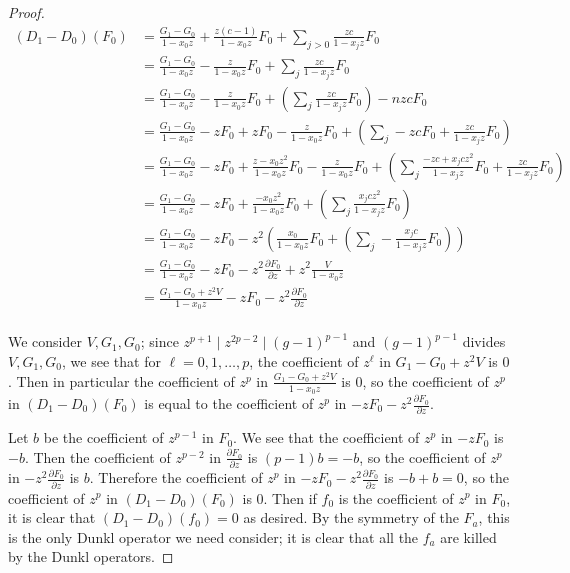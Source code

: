 \documentclass{article}
\numberwithin{equation}{section}
\begin{document}
\begin{proof}
\begin{align*}
(D_1-D_0)(F_0)&=\frac{G_1-G_0}{1-x_0z}+\frac{z(c-1)}{1-x_0z}F_0+\sum_{j>0} \frac{zc}{1-x_jz}F_0\\
&=\frac{G_1-G_0}{1-x_0z}-\frac{z}{1-x_0z}F_0+\sum_{j} \frac{zc}{1-x_jz}F_0\\
&=\frac{G_1-G_0}{1-x_0z}-\frac{z}{1-x_0z}F_0+\left(\sum_{j} \frac{zc}{1-x_jz}F_0\right)-nzcF_0\\
&=\frac{G_1-G_0}{1-x_0z}-zF_0+zF_0-\frac{z}{1-x_0z}F_0+\left(\sum_{j} -zcF_0+\frac{zc}{1-x_jz}F_0\right)\\
&=\frac{G_1-G_0}{1-x_0z}-zF_0+\frac{z-x_0z^2}{1-x_0z}F_0-\frac{z}{1-x_0z}F_0+\left(\sum_{j} \frac{-zc+x_jcz^2}{1-x_jz}F_0+\frac{zc}{1-x_jz}F_0\right)\\
&=\frac{G_1-G_0}{1-x_0z}-zF_0+\frac{-x_0z^2}{1-x_0z}F_0+\left(\sum_{j} \frac{x_jcz^2}{1-x_jz}F_0\right)\\
&=\frac{G_1-G_0}{1-x_0z}-zF_0-z^2\left(\frac{x_0}{1-x_0z}F_0+\left(\sum_{j}- \frac{x_jc}{1-x_jz}F_0\right)\right)\\
&=\frac{G_1-G_0}{1-x_0z}-zF_0-z^2\frac{\partial F_0}{\partial z}+z^2\frac{V}{1-x_0z}\\
&=\frac{G_1-G_0+z^2V}{1-x_0z}-zF_0-z^2\frac{\partial F_0}{\partial z}\\
\end{align*}

We consider $V,G_1,G_0$; since $z^{p+1} \mid z^{2p-2} \mid (g-1)^{p-1}$ and $(g-1)^{p-1}$ divides $V,G_1,G_0$, we see that for $\ell=0,1,\dots,p$, the coefficient of $z^\ell$ in $G_1-G_0+z^2V$ is $0$. Then in particular the coefficient of $z^p$ in $\frac{G_1-G_0+z^2V}{1-x_0z}$ is $0$, so the coefficient of $z^p$ in $(D_1-D_0)(F_0)$ is equal to the coefficient of $z^p$ in $-zF_0-z^2\frac{\partial F_0}{\partial z}$. 

Let $b$ be the coefficient of $z^{p-1}$ in $F_0$. We see that the coefficient of $z^p$ in $-zF_0$ is $-b$. Then the coefficient of $z^{p-2}$ in $\frac{\partial F_0}{\partial z}$ is $(p-1)b=-b$, so the coefficient of $z^p$ in $-z^2\frac{\partial F_0}{\partial z}$ is $b$. Therefore the coefficient of $z^p$ in $-zF_0-z^2\frac{\partial F_0}{\partial z}$ is $-b+b=0$, so the coefficient of $z^p$ in $(D_1-D_0)(F_0)$ is $0$. Then if $f_0$ is the coefficient of $z^p$ in $F_0$, it is clear that $(D_1-D_0)(f_0)=0$ as desired. By the symmetry of the $F_a$, this is the only Dunkl operator we need consider; it is clear that all the $f_a$ are killed by the Dunkl operators.
\end{proof}
\end{document}
